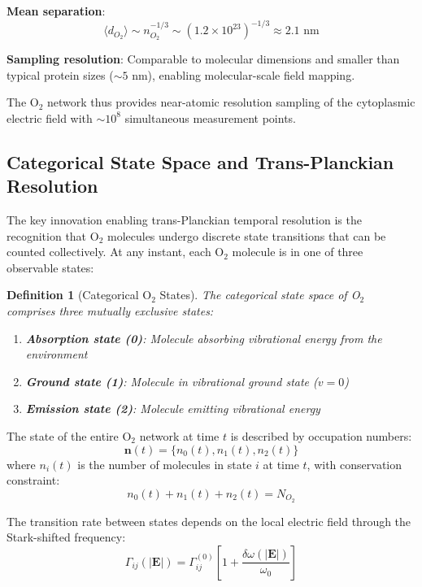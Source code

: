\documentclass[twocolumn,10pt,aps,prd,superscriptaddress,floatfix,nofootinbib]{revtex4-2}
\newtheorem{definition}[theorem]{Definition}
\theoremstyle{remark}
\begin{document}
\textbf{Mean separation}: 
\begin{equation}
\langle d_{O_2} \rangle \sim n_{O_2}^{-1/3} \sim (1.2 \times 10^{23})^{-1/3} \approx 2.1 \text{ nm}
\end{equation}

\textbf{Sampling resolution}: Comparable to molecular dimensions and smaller than typical protein sizes ($\sim 5$ nm), enabling molecular-scale field mapping.

The O$_2$ network thus provides near-atomic resolution sampling of the cytoplasmic electric field with $\sim 10^8$ simultaneous measurement points.

\subsection{Categorical State Space and Trans-Planckian Resolution}

The key innovation enabling trans-Planckian temporal resolution is the recognition that O$_2$ molecules undergo discrete state transitions that can be counted collectively. At any instant, each O$_2$ molecule is in one of three observable states:

\begin{definition}[Categorical O$_2$ States]
\label{def:categorical_states}
The categorical state space of O$_2$ comprises three mutually exclusive states:
\begin{enumerate}
\item \textbf{Absorption state (0)}: Molecule absorbing vibrational energy from the environment
\item \textbf{Ground state (1)}: Molecule in vibrational ground state ($v = 0$)
\item \textbf{Emission state (2)}: Molecule emitting vibrational energy
\end{enumerate}
\end{definition}

The state of the entire O$_2$ network at time $t$ is described by occupation numbers:
\begin{equation}
\mathbf{n}(t) = \{n_0(t), n_1(t), n_2(t)\}
\label{eq:occupation_numbers}
\end{equation}
where $n_i(t)$ is the number of molecules in state $i$ at time $t$, with conservation constraint:
\begin{equation}
n_0(t) + n_1(t) + n_2(t) = N_{O_2}
\label{eq:number_conservation}
\end{equation}

The transition rate between states depends on the local electric field through the Stark-shifted frequency:
\begin{equation}
\Gamma_{ij}(|\mathbf{E}|) = \Gamma_{ij}^{(0)} \left[1 + \frac{\delta\omega(|\mathbf{E}|)}{\omega_0}\right]
\label{eq:field_dependent_rates}
\end{equation}
\end{document}

